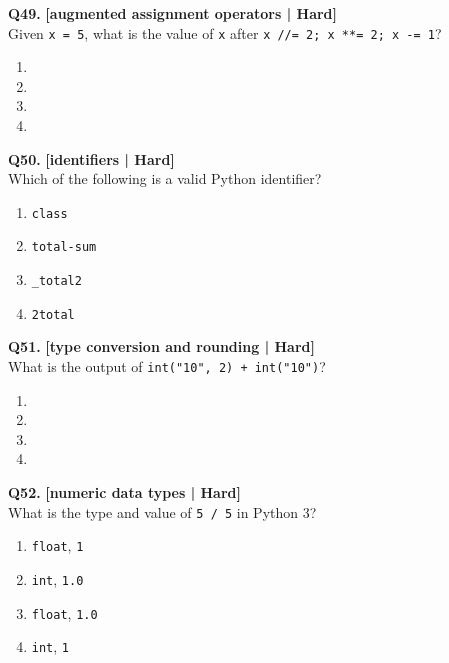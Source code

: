 \noindent\textbf{Q49.} \hfill {\small\color{LPUOrange}\textbf{[augmented assignment operators | Hard]}}\\[2pt]
Given \texttt{x = 5}, what is the value of \texttt{x} after \texttt{x //= 2; x **= 2; x -= 1}?

\begin{enumerate}[label=(\alph*),topsep=2pt,itemsep=1pt,partopsep=0pt,parsep=0pt]
    \item {}
    \item {}
    \item {}
    \item {}
\end{enumerate}
\vspace{2mm}

\noindent\textbf{Q50.} \hfill {\small\color{LPUOrange}\textbf{[identifiers | Hard]}}\\[2pt]
Which of the following is a valid Python identifier?

\begin{enumerate}[label=(\alph*),topsep=2pt,itemsep=1pt,partopsep=0pt,parsep=0pt]
    \item \relax \texttt{class}
    \item \relax \texttt{total-sum}
    \item \relax \texttt{\_total2}
    \item \relax \texttt{2total}
\end{enumerate}
\vspace{2mm}

\noindent\textbf{Q51.} \hfill {\small\color{LPUOrange}\textbf{[type conversion and rounding | Hard]}}\\[2pt]
What is the output of \texttt{int("10", 2) + int("10")}?

\begin{enumerate}[label=(\alph*),topsep=2pt,itemsep=1pt,partopsep=0pt,parsep=0pt]
    \item {}
    \item {}
    \item {}
    \item {}
\end{enumerate}
\vspace{2mm}

\noindent\textbf{Q52.} \hfill {\small\color{LPUOrange}\textbf{[numeric data types | Hard]}}\\[2pt]
What is the type and value of \texttt{5 / 5} in Python 3?

\begin{enumerate}[label=(\alph*),topsep=2pt,itemsep=1pt,partopsep=0pt,parsep=0pt]
    \item \relax \texttt{float}, \texttt{1}
    \item \relax \texttt{int}, \texttt{1.0}
    \item \relax \texttt{float}, \texttt{1.0}
    \item \relax \texttt{int}, \texttt{1}
\end{enumerate}
\vspace{2mm}

